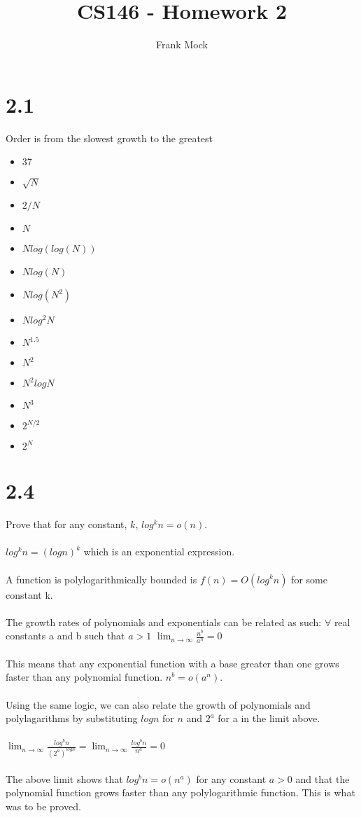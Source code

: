 \documentclass[12pt,letterpaper]{article}
\title{CS146 - Homework 2}
\author{Frank Mock}
\begin{document}
\maketitle
\section*{2.1}
Order is from the slowest growth to the greatest\\
\begin{itemize}
\item $37$
\item $\sqrt{N}$
\item $2/N$
\item $N$
\item $Nlog(log(N))$
\item $Nlog(N)$
\item $Nlog(N^2)$
\item $Nlog^2N$
\item $N^{1.5}$
\item $N^2$
\item $N^2logN$
\item $N^3$
\item $2^{N/2}$
\item $2^N$
\end{itemize}
\newpage
\section*{2.4}
Prove that for any constant, $k$, $log^kn = o(n)$.\\\\
$log^kn = (logn)^k$ which is an exponential expression.\\\\
A function is polylogarithmically bounded is $f(n) = O(log^kn)$ for some constant k.\\\\
The growth rates of polynomials and exponentials can be related as such: $\forall$ real constants a and b such that  $a > 1$ \hspace*{.5 cm} $\displaystyle \lim_{n \to \infty}\frac{n^b}{a^n} = 0$\\\\
This means that any exponential function with a base greater than one grows faster than any polynomial function. $n^b = o(a^n)$.\\\\ Using the same logic, we can also relate the growth of polynomials and polylagarithms by substituting $log n$ for $n$ and $2^a$ for a in the limit above.\\\\
$\displaystyle \lim_{n \to \infty}\frac{log^bn}{(2^a)^{logn}} = \lim_{n \to \infty}\frac{log^bn}{n^a} = 0$\\\\
The above limit shows that $log^bn = o(n^a)$ for any constant $a > 0$ and that the polynomial function grows faster than any polylogarithmic function. This is what was to be proved.
\end{document}
